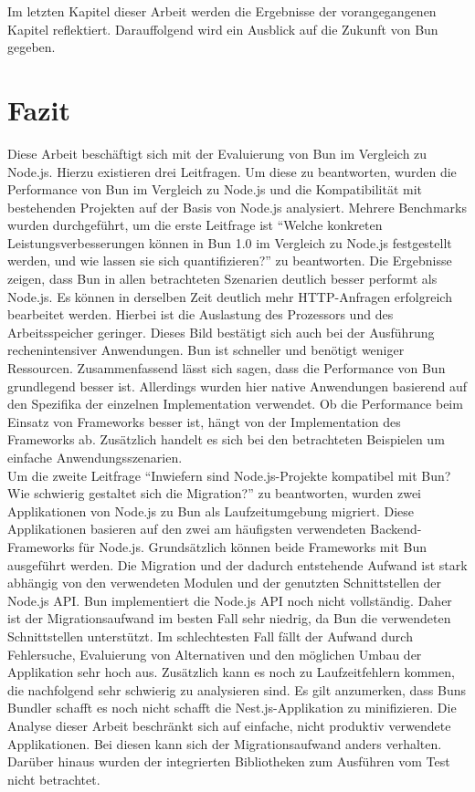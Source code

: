  \label{finalThoughts}
Im letzten Kapitel dieser Arbeit werden die Ergebnisse der vorangegangenen Kapitel reflektiert. Darauffolgend wird ein Ausblick auf die Zukunft von Bun gegeben.

\section{Fazit} \label{sec:finalThoughts-conclusion}
Diese Arbeit beschäftigt sich mit der Evaluierung von Bun im Vergleich zu Node.js. Hierzu existieren drei Leitfragen. Um diese zu beantworten, wurden die Performance von Bun im Vergleich zu Node.js und die Kompatibilität mit bestehenden Projekten auf der Basis von Node.js analysiert. \newline
Mehrere Benchmarks wurden durchgeführt, um die erste Leitfrage ist ``Welche konkreten Leistungsverbesserungen können in Bun 1.0 im Vergleich zu Node.js festgestellt werden, und wie lassen sie sich quantifizieren?'' zu beantworten. Die Ergebnisse zeigen, dass Bun in allen betrachteten Szenarien deutlich besser performt als Node.js. Es können in derselben Zeit deutlich mehr HTTP-Anfragen erfolgreich bearbeitet werden. Hierbei ist die Auslastung des Prozessors und des Arbeitsspeicher geringer. Dieses Bild bestätigt sich auch bei der Ausführung rechenintensiver Anwendungen. Bun ist schneller und benötigt weniger Ressourcen. Zusammenfassend lässt sich sagen, dass die Performance von Bun grundlegend besser ist. Allerdings wurden hier native Anwendungen basierend auf den Spezifika der einzelnen Implementation verwendet. Ob die Performance beim Einsatz von Frameworks besser ist, hängt von der Implementation des Frameworks ab. Zusätzlich handelt es sich bei den betrachteten Beispielen um einfache Anwendungsszenarien.\\

\noindent
Um die zweite Leitfrage ``Inwiefern sind Node.js-Projekte kompatibel mit Bun? Wie schwierig gestaltet sich die Migration?'' zu beantworten, wurden zwei Applikationen von Node.js zu Bun als Laufzeitumgebung migriert. Diese Applikationen basieren auf den zwei am häufigsten verwendeten Backend-Frameworks für Node.js. Grundsätzlich können beide Frameworks mit Bun ausgeführt werden. Die Migration und der dadurch entstehende Aufwand ist stark abhängig von den verwendeten Modulen und der genutzten Schnittstellen der Node.js API. Bun implementiert die Node.js API noch nicht vollständig. Daher ist der Migrationsaufwand im besten Fall sehr niedrig, da Bun die verwendeten Schnittstellen unterstützt. Im schlechtesten Fall fällt der Aufwand durch Fehlersuche, Evaluierung von Alternativen und den möglichen Umbau der Applikation sehr hoch aus. Zusätzlich kann es noch zu Laufzeitfehlern kommen, die nachfolgend sehr schwierig zu analysieren sind. Es gilt anzumerken, dass Buns Bundler schafft es noch nicht schafft die Nest.js-Applikation zu minifizieren. Die Analyse dieser Arbeit beschränkt sich auf einfache, nicht produktiv verwendete Applikationen. Bei diesen kann sich der Migrationsaufwand anders verhalten. Darüber hinaus wurden der integrierten Bibliotheken zum Ausführen vom Test nicht betrachtet.

